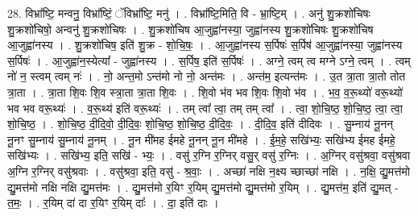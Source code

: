 \documentclass[17pt]{extarticle}
\begin{document}
28. विभ्रा᳚ष्टि॒ मन्वनु॒ विभ्रा᳚ष्टिं॒ ॅविभ्रा᳚ष्टि॒ मनु॑ । . विभ्रा᳚ष्टि॒मिति॒ वि - भ्रा॒ष्टि॒म् । . अनु॑ शु॒क्रशो॑चिषः शु॒क्रशो॑चिषो॒ अन्वनु॑ शु॒क्रशो॑चिषः । . शु॒क्रशो॑चिष आ॒जुह्वा॑नस्या॒ जुह्वा॑नस्य शु॒क्रशो॑चिषः शु॒क्रशो॑चिष आ॒जुह्वा॑नस्य । . शु॒क्रशो॑चिष॒ इति॑ शु॒क्र - शो॒चि॒षः॒ । . आ॒जुह्वा॑नस्य स॒र्पिषः॑ स॒र्पिष॑ आ॒जुह्वा॑नस्या॒ जुह्वा॑नस्य स॒र्पिषः॑ । . आ॒जुह्वा॑न॒स्येत्या᳚ - जुह्वा॑नस्य । . स॒र्पिष॒ इति॑ स॒र्पिषः॑ । . अग्ने॒ त्वम् त्व मग्ने ऽग्ने॒ त्वम् । . त्वम् नो॑ न॒ स्त्वम् त्वम् नः॑ । . नो॒ अन्त॒मो ऽन्त॑मो नो नो॒ अन्त॑मः । . अन्त॑म॒ इत्यन्त॑मः । . उ॒त त्रा॒ता त्रा॒तो तोत त्रा॒ता । . त्रा॒ता शि॒वः शि॒व स्त्रा॒ता त्रा॒ता शि॒वः । . शि॒वो भ॑व भव शि॒वः शि॒वो भ॑व । . भ॒व॒ व॒रू॒थ्यो॑ वरू॒थ्यो॑ भव भव वरू॒थ्यः॑ । . व॒रू॒थ्य॑ इति॑ वरू॒थ्यः॑ । . तम् त्वा᳚ त्वा॒ तम् तम् त्वा᳚ । . त्वा॒ शो॒चि॒ष्ठ॒ शो॒चि॒ष्ठ॒ त्वा॒ त्वा॒ शो॒चि॒ष्ठ॒ । . शो॒चि॒ष्ठ॒ दी॒दि॒वो॒ दी॒दि॒वः॒ शो॒चि॒ष्ठ॒ शो॒चि॒ष्ठ॒ दी॒दि॒वः॒ । . दी॒दि॒व॒ इति॑ दीदिवः । . सु॒म्नाय॑ नू॒नन् नू॒नꣳ सु॒म्नाय॑ सु॒म्नाय॑ नू॒नम् । . नू॒न मी॑मह ईमहे नू॒नन् नू॒न मी॑महे । . ई॒म॒हे॒ सखि॑भ्यः॒ सखि॑भ्य ईमह ईमहे॒ सखि॑भ्यः । . सखि॑भ्य॒ इति॒ सखि॑ - भ्यः॒ । . वसु॑ र॒ग्नि र॒ग्निर् वसु॒र् वसु॑ र॒ग्निः । . अ॒ग्निर् वसु॑श्रवा॒ वसु॑श्रवा अ॒ग्नि र॒ग्निर् वसु॑श्रवाः । . वसु॑श्रवा॒ इति॒ वसु॑ - श्र॒वाः॒ । . अच्छा॑ नक्षि न॒क्ष्य च्छाच्छा॑ नक्षि । . न॒क्षि॒ द्यु॒मत्त॑मो द्यु॒मत्त॑मो नक्षि नक्षि द्यु॒मत्त॑मः । . द्यु॒मत्त॑मो र॒यिꣳ र॒यिम् द्यु॒मत्त॑मो द्यु॒मत्त॑मो र॒यिम् । . द्यु॒मत्त॑म॒ इति॑ द्यु॒मत् - त॒मः॒ । . र॒यिम् दा॑ दा र॒यिꣳ र॒यिम् दाः᳚ । . दा॒ इति॑ दाः । \newline
\end{document}
